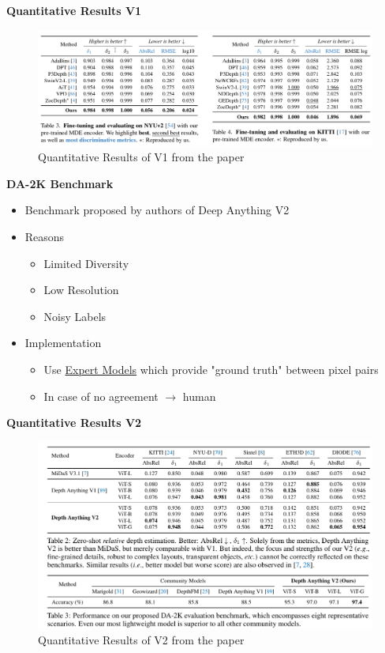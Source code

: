 \documentclass[12pt]{beamer}
\begin{document}
\begin{frame}        
    \textbf{Quantitative Results V1}
    \begin{figure}
        \centering
        \includegraphics[width=\textwidth]{./figures/screenshot_table-results_v1.png}
        \caption{Quantitative Results of V1 from the paper}
        \label{fig:res_quant_v1}
    \end{figure}
\end{frame}
\begin{frame}
    \scriptsize
    \textbf{DA-2K Benchmark}
    \begin{itemize}
        \item Benchmark proposed by authors of Deep Anything V2
        \item Reasons
        \begin{itemize}
            \item Limited Diversity
            \item Low Resolution
            \item Noisy Labels
        \end{itemize}
        \item Implementation
        \begin{itemize}
            \item Use \underline{Expert Models} which provide "ground truth" between pixel pairs
            \item In case of no agreement $\rightarrow$ human
        \end{itemize}
    \end{itemize}
\end{frame}
\begin{frame}        
    \textbf{Quantitative Results V2}
    \begin{figure}
        \centering
        \includegraphics[width=\textwidth]{./figures/screenshot_table-results_v2.png}
        \caption{Quantitative Results of V2 from the paper}
        \label{fig:res_quant_v2}
    \end{figure}
\end{frame}
    
\end{document}
